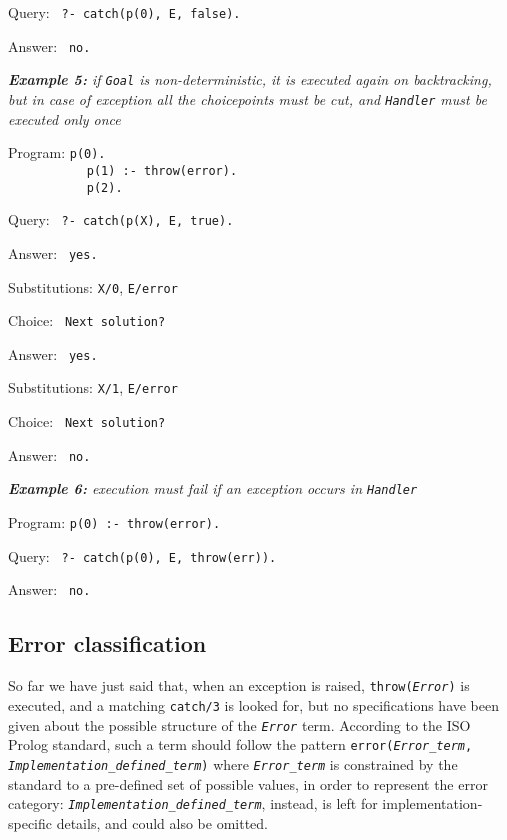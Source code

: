 Query: \texttt{ ?- catch(p(0), E, false).}

Answer: \texttt{ no.}

\medskip
\textit{\textbf{Example 5:} if \texttt{Goal} is non-deterministic, it is executed again on
backtracking, but in case of exception all the choicepoints must be cut, and \texttt{Handler} must
be executed only once}

Program: \texttt{p(0).}\\
\mbox{\texttt{~~~~~~~~~~~}}\texttt{p(1) :- throw(error).}\\
\mbox{\texttt{~~~~~~~~~~~}}\texttt{p(2).}

Query: \texttt{ ?- catch(p(X), E, true).}

Answer: \texttt{ yes.}

Substitutions: \texttt{X/0}, \texttt{E/error}

Choice: \texttt{ Next solution?}

Answer: \texttt{ yes.}

Substitutions: \texttt{X/1}, \texttt{E/error}

Choice: \texttt{ Next solution?}

Answer: \texttt{ no.}

\medskip
\textit{\textbf{Example 6:} execution must fail if an exception occurs in \texttt{Handler}}

Program: \texttt{p(0) :- throw(error).}

Query: \texttt{ ?- catch(p(0), E, throw(err)).}

Answer: \texttt{ no.}

\subsection{Error classification}
\label{ssec:error classification}
So far we have just said that, when an exception is raised, \texttt{throw(\textit{Error})} is
executed, and a matching \texttt{catch/3} is looked for, but no specifications have been given
about the possible structure of the \texttt{\textit{Error}} term.
%
According to the ISO Prolog standard, such a term should follow the pattern
\texttt{error(\textit{Error\_term}, \textit{Implementation\_defined\_term})} where
\texttt{\textit{Error\_term}} is constrained by the standard to a pre-defined set of possible
values, in order to represent the error category: \texttt{\textit{Implementation\_defined\_term}},
instead, is left for implementation-specific details, and could also be omitted.

